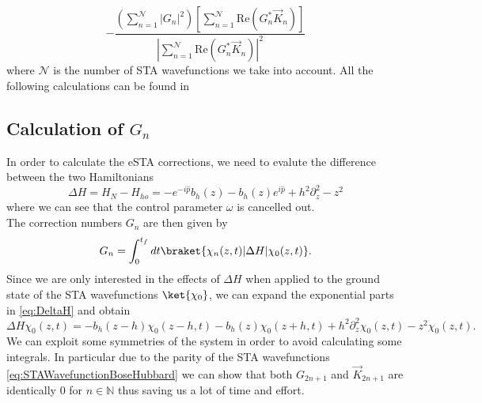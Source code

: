 \begin{equation}
	\label{eq:eSTAcorrections}
	-\frac
	{\left( \sum_{n=1}^{\mathcal{N}} |G_{n}|^2 \right)	\left[ \sum_{n=1}^{\mathcal{N}}\text{Re}(G_{n}^{*}\vec{K}_{n})\right]  }
	{\left|\sum_{n=1}^{\mathcal{N}}\text{Re}(G_{n}^{*}\vec{K}_{n})\right|^2 }
\end{equation}
where $ \mathcal{N} $ is the number of STA wavefunctions we take into account.
All the following calculations can be found in \cite{1912.06057v1}
\subsection{Calculation of $G_{n}$}
In order to calculate the eSTA corrections, we need to evalute the difference between the two Hamiltonians
\begin{equation}
	\label{eq:DeltaH}
	\Delta H = H_{N} - H_{ho} =
	- e^{-i\hat{p}} b_{h}(z) - b_{h}(z)e^{i\hat{p}} + h^2 \partial_z^2 - z^2
\end{equation}
where we can see that the control parameter $ \omega $ is cancelled out.\\
The correction numbers $ G_{n} $ are then given by
\begin{equation}
	\label{eq:Gns}
	G_{n} = \int_{0}^{t_{f}} dt \braket{\chi_{n}(z,t)| \Delta H|\chi_{0}(z,t)}.
\end{equation}
Since we are only interested in the effects of $ \Delta H  $ when applied to the ground state of the STA wavefunctions $ \ket{\chi_{0}} $, we can expand the exponential parts in \cref{eq:DeltaH} and obtain
\begin{equation}
	\label{eq:DeltaHOnGroundState}
	\Delta H \chi_{0}(z,t) = - b_{h}(z-h)\chi_{0}(z-h,t) - b_{h}(z)\chi_{0}(z+h,t) + h^2\partial^2_{z}\chi_{0}(z,t) - z^2\chi_{0}(z,t).
\end{equation}
We can exploit some symmetries of the system in order to avoid calculating some integrals.
In particular due to the parity of the STA wavefunctions \cref{eq:STAWavefunctionBoseHubbard} we can show that both $ G_{2n+1} $ and $ \vec{K}_{2n +1} $ are identically 0 for $ n \in \mathbb{N} $ thus saving us a lot of time and effort.
